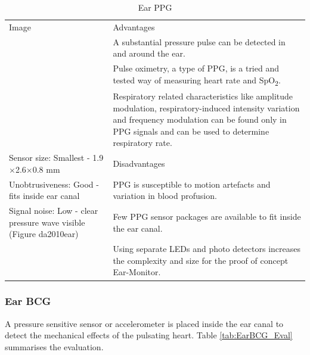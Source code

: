 \begin{table}[H]
\caption{Ear PPG}
\label{tab:EarPPG_Eval}
\renewcommand{\arraystretch}{1.3}	%
\centering
\begin{tabular}{|p{5cm}|p{8cm}|} 
 \hline
 Image 		& 	Advantages  \\ 
  			&	\tabitem A substantial pressure pulse can be detected in and around the ear.\\
  			&	\tabitem Pulse oximetry, a type of PPG, is a tried and tested way of measuring heart rate and SpO\textsubscript{2}.\\
  			&	\tabitem Respiratory related characteristics like amplitude modulation, respiratory-induced intensity variation and frequency modulation can be found only in PPG signals and can be used to determine respiratory rate.\\
\hline
Sensor size: Smallest - 1.9$\times$2.6$\times$0.8 mm		&	Disadvantages  \\ 
Unobtrusiveness: Good - fits inside ear canal 				&	\tabitem PPG is susceptible to motion artefacts and variation in blood profusion.\\
Signal noise: Low - clear pressure wave visible (Figure da2010ear) 						&	\tabitem Few PPG sensor packages are available to fit inside the ear canal.\\
  															&	\tabitem Using separate LEDs and photo detectors increases the complexity  and size for the proof of concept Ear-Monitor.\\
 
 \hline
\end{tabular}
\end{table}

\subsubsection{Ear BCG}
A pressure sensitive sensor or accelerometer is placed inside the ear canal to detect the mechanical effects of the pulsating heart. Table \ref{tab:EarBCG_Eval} summarises the evaluation.

